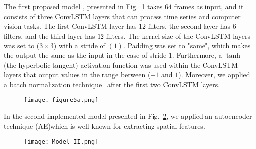 \begin{sloppypar}
	The first proposed model \DIFaddbegin {}\DIFaddend , presented in Fig.~\ref{fig:convlstm_model} takes \(64\) frames as input, and it consists of three ConvLSTM layers that can process time series and computer vision tasks.
	The first ConvLSTM layer has \(12\) filters, the second layer has \(6\) filters, and the third layer has \(12\) filters.
	The kernel size of the ConvLSTM layers was set to (\(3\times3\)) with a stride of \((1)\). 
	Padding was set to "same", which makes the output the same as the input in the case of stride \(1\).
	Furthermore, a \(\tanh\) (the hyperbolic tangent) activation function was used within the ConvLSTM layers that output values in the range between (\(-1\) and \(1\)).
	Moreover, we applied a batch normalization technique~\cite{Santurkar2018} after the first two ConvLSTM layers.
	\DIFaddbegin \begin{figure} [\DIFaddFL{!ht}]
		\centering
			\centering
			\texttt{[image: figure5a.png]}
			\caption{} %
			\label{fig:convlstm_model}
	\end{figure}
\DIFaddend 

	In the second implemented model \DIFaddbegin {}\DIFaddend presented in Fig.~\ref{fig:AE_convlstm}, we applied an autoencoder technique (AE)\DIFaddbegin \DIFadd{, }\DIFaddend which is well-known for extracting spatial features.
	\DIFaddbegin 

	\begin{figure} [\DIFaddFL{ht!}]
			\centering
			\texttt{[image: Model\_II.png]}
			\caption{} %
			\label{fig:AE_convlstm}
	\end{figure} 


\end{sloppypar}

